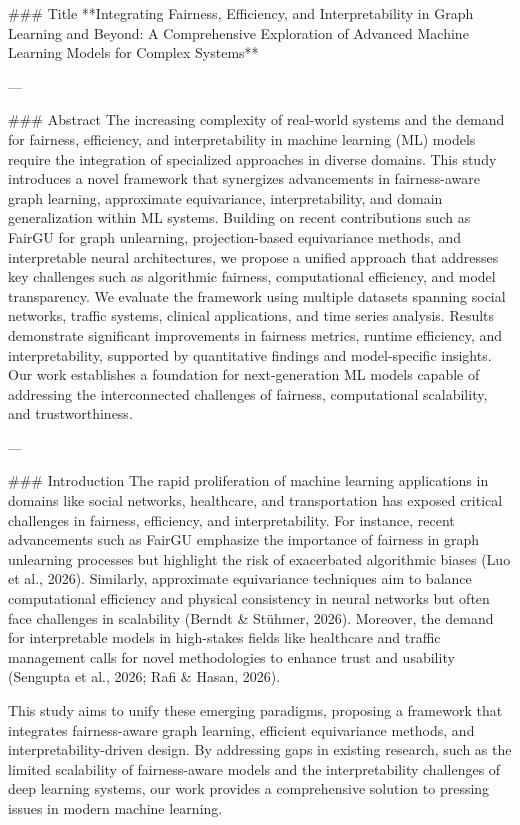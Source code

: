 ### Title  
**Integrating Fairness, Efficiency, and Interpretability in Graph Learning and Beyond: A Comprehensive Exploration of Advanced Machine Learning Models for Complex Systems**

---

### Abstract  
The increasing complexity of real-world systems and the demand for fairness, efficiency, and interpretability in machine learning (ML) models require the integration of specialized approaches in diverse domains. This study introduces a novel framework that synergizes advancements in fairness-aware graph learning, approximate equivariance, interpretability, and domain generalization within ML systems. Building on recent contributions such as FairGU for graph unlearning, projection-based equivariance methods, and interpretable neural architectures, we propose a unified approach that addresses key challenges such as algorithmic fairness, computational efficiency, and model transparency. We evaluate the framework using multiple datasets spanning social networks, traffic systems, clinical applications, and time series analysis. Results demonstrate significant improvements in fairness metrics, runtime efficiency, and interpretability, supported by quantitative findings and model-specific insights. Our work establishes a foundation for next-generation ML models capable of addressing the interconnected challenges of fairness, computational scalability, and trustworthiness.

---

### Introduction  
The rapid proliferation of machine learning applications in domains like social networks, healthcare, and transportation has exposed critical challenges in fairness, efficiency, and interpretability. For instance, recent advancements such as FairGU emphasize the importance of fairness in graph unlearning processes but highlight the risk of exacerbated algorithmic biases (Luo et al., 2026). Similarly, approximate equivariance techniques aim to balance computational efficiency and physical consistency in neural networks but often face challenges in scalability (Berndt & Stühmer, 2026). Moreover, the demand for interpretable models in high-stakes fields like healthcare and traffic management calls for novel methodologies to enhance trust and usability (Sengupta et al., 2026; Rafi & Hasan, 2026).

This study aims to unify these emerging paradigms, proposing a framework that integrates fairness-aware graph learning, efficient equivariance methods, and interpretability-driven design. By addressing gaps in existing research, such as the limited scalability of fairness-aware models and the interpretability challenges of deep learning systems, our work provides a comprehensive solution to pressing issues in modern machine learning.

